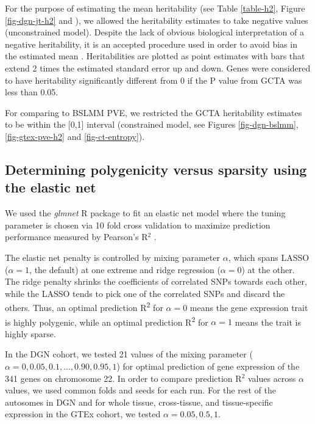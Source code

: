 \documentclass[10pt,letterpaper]{article}
\begin{document}
For the purpose of estimating the mean heritability (see Table \ref{table-h2}, Figure \ref{fig-dgn-jt-h2} and ), we allowed the heritability estimates to 
take negative values (unconstrained model). Despite the lack of obvious biological interpretation of a negative heritability, 
it is an accepted procedure used in order to avoid bias in the estimated mean \cite{Price_2011,Wright_2014}. Heritabilities are plotted as point estimates with bars that extend 2 times the estimated standard error up and down. Genes were considered to have heritability significantly different from 0 if the P value from GCTA was less than 0.05.

For comparing to BSLMM PVE, we restricted the GCTA heritability estimates to be within the [0,1] interval (constrained model, see Figures \ref{fig-dgn-bslmm}, \ref{fig-gtex-pve-h2} and \ref{fig-ct-entropy}). 

\subsection*{Determining polygenicity versus sparsity using the elastic
net}\label{determining-polygenicity-versus-sparsity-using-the-elastic-net}

We used the \textit{glmnet} R package to fit an elastic net model where the tuning parameter is chosen via 10 fold cross validation to maximize prediction performance measured by Pearson's R$^2$ \cite{Friedman_2010, Simon_2011}.

The elastic net penalty is controlled by mixing parameter \(\alpha\),
which spans LASSO (\(\alpha=1\), the default) \cite{Tibshirani_1996} at one extreme
and ridge regression (\(\alpha=0\)) \cite{Hoerl_1970} at the other. The ridge
penalty shrinks the coefficients of correlated SNPs towards each other,
while the LASSO tends to pick one of the correlated SNPs and discard the
others. Thus, an optimal prediction R\textsuperscript{2} for
\(\alpha=0\) means the gene expression trait is highly polygenic, while
an optimal prediction R\textsuperscript{2} for \(\alpha=1\) means the
trait is highly sparse. 

In the DGN cohort, we tested 21 values of the mixing parameter
(\(\alpha=0, 0.05, 0.1, ..., 0.90, 0.95, 1\)) for optimal prediction of
gene expression of the 341 genes on chromosome 22. In order to compare prediction R$^2$ values across $\alpha$ values, we used common folds and seeds for each run. For the rest of the
autosomes in DGN and for whole tissue, cross-tissue, and tissue-specific
expression in the GTEx cohort, we tested \(\alpha=0.05, 0.5, 1\).
\end{document}
